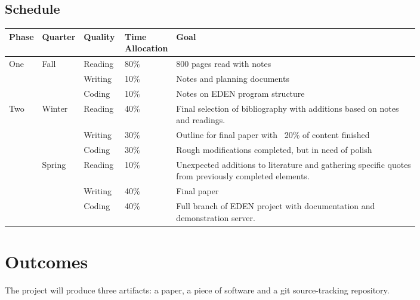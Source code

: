 \documentclass[a4paper,man,natbib]{apa6}
\begin{document}
   \subsection*{Schedule}
   \begin{center}
   \begin{tabular}{|l|l|p{0.1\linewidth}|p{0.1\linewidth}|p{0.6\linewidth}|}
   \hline
   Phase & Quarter & Quality & Time Allocation & Goal                         \\ \hline
   One   & Fall    & Reading & 80\%            & 800 pages read with notes    \\ \cline{3-5} 
         &         & Writing & 10\%            & Notes and planning documents \\ \cline{3-5} 
         &         & Coding  & 10\%            & Notes on \acrshort{EDEN} program structure   \\ \hline 
   Two   & Winter  & Reading & 40\%            & Final selection of bibliography with additions based on notes and readings.   \\ \cline{3-5} 
         &         & Writing & 30\%            & Outline for final paper with ~20\% of content finished \\ \cline{3-5} 
         &         & Coding  & 30\%            & Rough modifications completed, but in need of polish  \\ \cline{2-5}
         & Spring  & Reading & 10\%            & Unexpected additions to literature and gathering specific quotes from previously completed elements.   \\ \cline{3-5} 
         &         & Writing & 40\%            & Final paper \\ \cline{3-5}
         &         & Coding  & 40\%            & Full branch of \acrshort{EDEN} project with documentation and demonstration server. \\ \hline
   \end{tabular}
   \end{center}
   \newpage
   \section*{Outcomes}
   The project will produce three artifacts: a paper, a piece of software and a git source-tracking repository.
\end{document}
